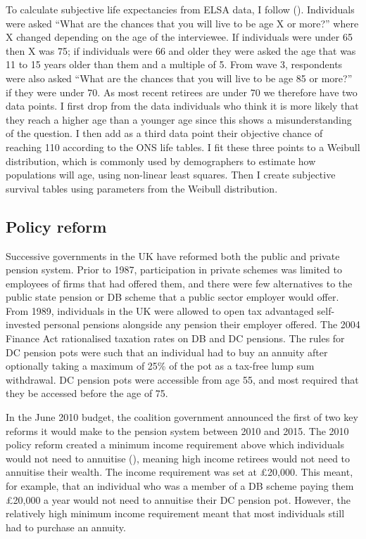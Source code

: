 \documentclass[12pt]{article}
\begin{document}
To calculate subjective life expectancies from ELSA data, I follow
(\cite{odea-sturrock-rest-2023}). Individuals were asked “What are the chances
that you will live to be age X or more?” where X changed depending on the age of
the interviewee. If individuals were under 65 then X was 75; if individuals were
66 and older they were asked the age that was 11 to 15 years older than them and
a multiple of 5. From wave 3, respondents were also asked “What are the chances
that you will live to be age 85 or more?” if they were under 70. As most recent
retirees are under 70 we therefore have two data points. I first drop from the
data individuals who think it is more likely that they reach a higher age than a
younger age since this shows a misunderstanding of the question. I then add as a
third data point their objective chance of reaching 110 according to the ONS
life tables. I fit these three points to a Weibull distribution, which is
commonly used by demographers to estimate how populations will age, using
non-linear least squares. Then I create subjective survival tables using
parameters from the Weibull distribution.


\subsection{Policy reform}

Successive governments in the UK have reformed both the public and
private pension system. Prior to 1987, participation in private schemes was
limited to employees of firms that had offered them, and there were few
alternatives to the public state pension or DB scheme that a public sector
employer would offer. From 1989, individuals in the UK were allowed to open tax
advantaged self-invested personal pensions alongside any pension their employer
offered. The 2004 Finance Act rationalised taxation rates on DB and DC pensions.
The rules for DC pension pots were such that an individual had to buy an annuity
after optionally taking a maximum of 25\% of the pot as a tax-free lump sum
withdrawal. DC pension pots were accessible from age 55, and most required that
they be accessed before the age of 75.

In the June 2010 budget, the coalition government announced the first of two key
reforms it would make to the pension system between 2010 and 2015. The 2010
policy reform created a minimum income requirement above which individuals would
not need to annuitise (\cite{finance-act-hmt-2011}), meaning high income
retirees would not need to annuitise their wealth. The income requirement was
set at £20,000. This meant, for example, that an individual who was a member of
a DB scheme paying them £20,000 a year would not need to annuitise their DC
pension pot. However, the relatively high minimum income requirement meant that
most individuals still had to purchase an annuity.
\end{document}
